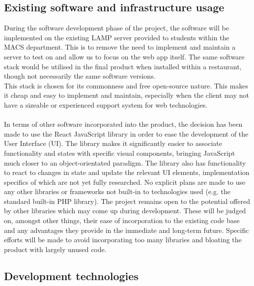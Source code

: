\documentclass[11pt, a4paper]{report}
\begin{document}
\subsection{Existing software and infrastructure usage}

During the software development phase of the project, the software will be implemented on the existing LAMP server provided to students within the MACS department. This is to remove the need to implement and maintain a server to test on and allow us to focus on the web app itself. The same software stack would be utilised in the final product when installed within a restaurant, though not necessarily the same software versions.\\
This stack is chosen for its commonness and free open-source nature. This makes it cheap and easy to implement and maintain, especially when the client may not have a sizeable or experienced support system for web technologies.\\
\\
In terms of other software incorporated into the product, the decision has been made to use the React JavaScript library in order to ease the development of the User Interface (UI). The library makes it significantly easier to associate functionality and states with specific visual components, bringing JavaScript much closer to an object-orientated paradigm. The library also has functionality to react to changes in state and update the relevant UI elements, implementation specifics of which are not yet fully researched. No explicit plans are made to use any other libraries or frameworks not built-in to technologies used (e.g. the standard built-in PHP library). The project remains open to the potential offered by other libraries which may come up during development. These will be judged on, amongst other things, their ease of incorporation to the existing code base and any advantages they provide in the immediate and long-term future. Specific efforts will be made to avoid incorporating too many libraries and bloating the product with largely unused code.


\subsection{Development technologies}
\end{document}
